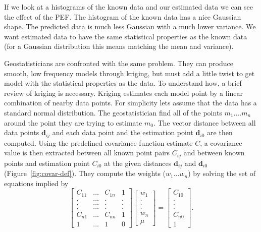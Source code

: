 \par
If we look at a histograms of the known data and our estimated data we
can see the effect of the PEF.  The histogram of the known data has a
nice Gaussian shape.  The predicted
data is much less Gaussian with a much lower variance.  We want estimated 
data to have the same statistical properties as the known data (for
a Gaussian distribution this means matching the mean and variance).
\par
Geostatisticians are confronted with the same problem. They can produce
smooth, low frequency models through kriging, but must add a little
twist to get model with the statistical properties as the data.
To understand how, a brief review of kriging is necessary.
Kriging estimates each model point by a linear combination of nearby data 
points. For simplicity lets assume that the data has a standard
normal distribution.
The geostatistician find all of the points $m_1 .... m_n$ around the point they
are trying to estimate $m_0$. The vector distance between all data points
$\mathbf{d}_{ij}$
and each data point and the estimation point $\mathbf{d}_{i0}$ are then computed.
Using the predefined covariance function estimate $C$, a covariance
value is then extracted
between all known point pairs $C_{ij}$ and
between known points and
estimation point $C_{i0}$ at the given distances $\mathbf{d}_{ij}$  and
$\mathbf{d}_{i0}$   (Figure~\ref{fig:covar-def}).
They compute the weights   ($w_1 ... w_n$) by solving the set
of equations implied by
\begin{equation}
\left[
\begin{array}{cccc}
C_{11}  &...& C_{1n} & 1 \\
.  &...& . & . \\
.  &...& . & . \\
.  &...& . & . \\
C_{n1}  &...& C_{nn} &  1 \\
1 &...& 1 & 0
\end{array}
\right]
\left[
\begin{array}{c}
w_1 \\
. \\
. \\
. \\
w_n \\
\mu
\end{array}
\right]
=
\left[
\begin{array}{c}
C_{10} \\
. \\
. \\
. \\
C_{n0} \\
1
\end{array} \label{eq:krig}
\right] .
\end{equation}
